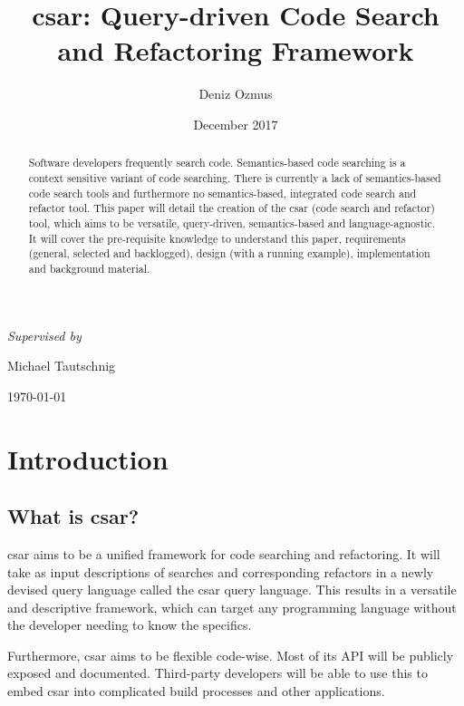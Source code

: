 \documentclass[12pt, letterpaper]{article}
\title{csar: Query-driven Code Search and Refactoring Framework}
\author{Deniz Ozmus}
\date{December 2017}
\def \supervisor {Michael Tautschnig}
\begin{document}
\nocite{*}

\begin{titlepage}
  \centering
  {\Large \MyTitle\par}
  \vspace{3cm}
  {\MyAuthor\par}
  \vspace{0.5cm}
  {\itshape Supervised by }{ \supervisor\par}
  \vspace{13cm}
  {\today\par}
\end{titlepage}

\begin{abstract}
  Software developers frequently search code.
  Semantics-based code searching is a context sensitive variant of code searching.
  There is currently a lack of semantics-based code search tools and furthermore no semantics-based, integrated code search and refactor tool.
  This paper will detail the creation of the csar (code search and refactor) tool, which aims to be versatile, query-driven, semantics-based and language-agnostic.
  It will cover the pre-requisite knowledge to understand this paper, requirements (general, selected and backlogged), design (with a running example), implementation and background material.
\end{abstract}
\newpage

\tableofcontents
\newpage

\section{Introduction}
\subsection{What is csar?}

csar aims to be a unified framework for code searching and refactoring. It will take as input descriptions of searches and corresponding refactors in a newly devised query language called the csar query language. This results in a versatile and descriptive framework, which can target any programming language without the developer needing to know the specifics.

Furthermore, csar aims to be flexible code-wise. Most of its API will be publicly exposed and documented. Third-party developers will be able to use this to embed csar into complicated build processes and other applications.
\end{document}
